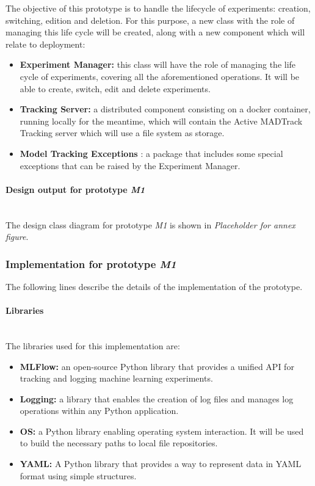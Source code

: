 The objective of this prototype is to handle the lifecycle of experiments: creation, switching,
edition and deletion. For this purpose, a new class with the role of managing this life cycle will be created, along with a new component which 
will relate to deployment:

\begin{itemize}
    \item \textbf{Experiment Manager: }this class will have the role of managing the life cycle of experiments, covering all the aforementioned 
    operations. It will be able to create, switch, edit and delete experiments.

    \item \textbf{Tracking Server: }a distributed component consisting on a docker container, running locally for the meantime, which will contain
    the Active MADTrack Tracking server which will use a file system as storage.

    \item \textbf{Model Tracking Exceptions }: a package that includes some special exceptions that can be raised by the Experiment Manager. 
\end{itemize}

\paragraph{Design output for prototype \emph{M1}}\mbox{}\\

The design class diagram for prototype \emph{M1} is shown in \emph{Placeholder for annex figure}.

\subsubsection{Implementation for prototype \emph{M1}}

The following lines describe the details of the implementation of the prototype.

\paragraph{Libraries} \mbox{}\\

The libraries used for this implementation are:

\begin{itemize}
    \item \textbf{MLFlow: }an open-source Python library that provides a unified API for tracking and logging machine learning experiments.
    \item \textbf{Logging: }a library that enables the creation of log files and manages log operations within any Python application.
    \item \textbf{OS: }a Python library enabling operating system interaction. It will be used to build the necessary paths to local file repositories.
    \item \textbf{YAML: }A Python library that provides a way to represent data in YAML format using simple structures.
\end{itemize}

